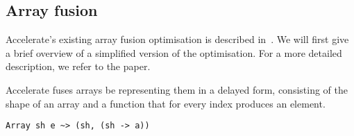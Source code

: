 









\subsection{Array fusion}

Accelerate's existing array fusion optimisation is described in~\cite{McDonell:acc-optim}. We will first give a brief overview of a simplified version of the optimisation. For a more detailed description, we refer to the paper.

Accelerate fuses arrays be representing them in a delayed form, consisting of the shape of an array and a function that for every index produces an element.
%
\begin{lstlisting}
Array sh e ~> (sh, (sh -> a))
\end{lstlisting}
